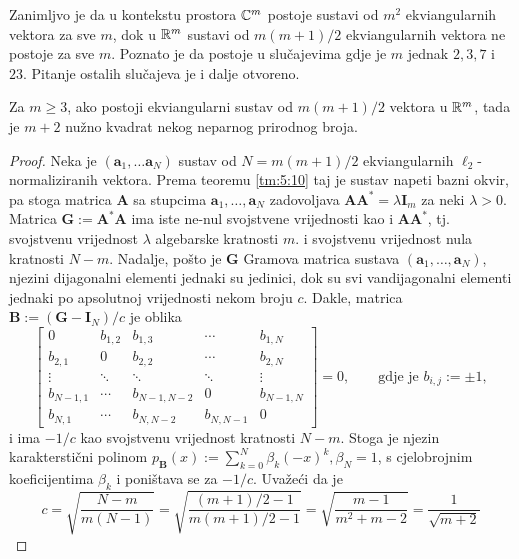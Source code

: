 \documentclass[a4paper,twoside,12pt]{memoir} %
\newcommand{\vect}[1]{\mathbf{#1}}
\renewcommand{\vec}{\vect}
\begin{document}
Zanimljvo je da u kontekstu prostora $\mathbb{C}^m$ postoje sustavi od $m^2$ ekviangularnih vektora za sve $m$, dok u $\mathbb{R}^m$ sustavi od $m(m+1)/2$ ekviangularnih vektora ne postoje za sve $m$. Poznato je da postoje u slu\v{c}ajevima gdje je $m$ jednak $2,3,7$ i $23$. Pitanje ostalih slu\v{c}ajeva je i dalje otvoreno.
 
\begin{thm}
    Za $m \geq 3$, ako postoji ekviangularni sustav od $m(m+1)/2$ vektora u $\mathbb{R}^m$, tada je $m+2$ nu\v{z}no kvadrat nekog neparnog prirodnog broja.
\end{thm}
\begin{proof}
    Neka je $(\vec a_1, \dots \vec a_N)$ sustav od $N = m(m+1)/2$ ekviangularnih $\ell_2$-normaliziranih vektora. Prema teoremu \ref{tm:5:10} taj je sustav napeti bazni okvir, pa stoga matrica $\vec A$ sa stupcima $\vec a_1, \dots, \vec a_N$ zadovoljava $\vec{AA}^* = \lambda \vec I_m$ za neki $\lambda > 0$. Matrica $\vec G := \vec A^* \vec A$ ima iste ne-nul svojstvene vrijednosti kao i $\vec{AA}^*$, tj. svojstvenu vrijednost $\lambda$ algebarske kratnosti $m$. i svojstvenu vrijednost nula kratnosti $N-m$. Nadalje, po\v{s}to je $\vec G$ Gramova matrica sustava $(\vec a_1, \dots, \vec a_N)$, njezini dijagonalni elementi jednaki su jedinici, dok su svi vandijagonalni elementi jednaki po apsolutnoj vrijednosti nekom broju $c$. Dakle, matrica $\vec B := (\vec G - \vec I_N)/c$ je oblika
    \begin{equation*}
        \begin{bmatrix*}
            0 & b_{1,2} & b_{1,3} & \cdots & b_{1,N} \\
            b_{2,1} & 0 & b_{2,2} & \cdots & b_{2,N} \\
            \vdots & \ddots & \ddots & \ddots & \vdots \\ 
            b_{N-1,1} & \cdots & b_{N-1, N-2} & 0 & b_{N-1,N} \\
            b_{N,1} & \cdots & b_{N,N-2} & b_{N,N-1} & 0 
        \end{bmatrix*} = 0, \quad \quad \text{gdje je } b_{i,j}:= \pm 1,
    \end{equation*}
    i ima $-1/c$ kao svojstvenu vrijednost kratnosti $N-m$. Stoga je njezin karaktersti\v{c}ni polinom $p_{\vec B}(x) := \sum_{k = 0}^N \beta_k (-x)^k, \beta_N = 1$, s cjelobrojnim koeficijentima $\beta_k$ i poni\v{s}tava se za $-1/c$. Uva\v{z}e\'ci da je
    \begin{equation*}
        c = \sqrt{\frac{N-m}{m(N-1)}} = \sqrt{\frac{(m+1)/2-1}{m(m+1)/2 -1}} = \sqrt{\frac{m-1}{m^2 + m - 2}} = \frac{1}{\sqrt{m+2}}

\end{equation*}
\end{proof}
\end{document}
